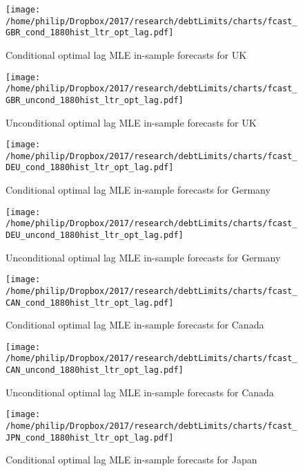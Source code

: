 \documentclass{article}
\begin{document}
	\begin{figure}[htbp]
	    \centering
		\texttt{[image: /home/philip/Dropbox/2017/research/debtLimits/charts/fcast\_GBR\_cond\_1880hist\_ltr\_opt\_lag.pdf]}
		\caption{Conditional optimal lag MLE in-sample forecasts for UK}
	\end{figure}
	
	\begin{figure}[htbp]
	    \centering
		\texttt{[image: /home/philip/Dropbox/2017/research/debtLimits/charts/fcast\_GBR\_uncond\_1880hist\_ltr\_opt\_lag.pdf]}
		\caption{Unconditional optimal lag MLE in-sample forecasts for UK}
	\end{figure}
	
	\begin{figure}[htbp]
	    \centering
		\texttt{[image: /home/philip/Dropbox/2017/research/debtLimits/charts/fcast\_DEU\_cond\_1880hist\_ltr\_opt\_lag.pdf]}
		\caption{Conditional optimal lag MLE in-sample forecasts for Germany}
	\end{figure}
	
	\begin{figure}[htbp]
	    \centering
		\texttt{[image: /home/philip/Dropbox/2017/research/debtLimits/charts/fcast\_DEU\_uncond\_1880hist\_ltr\_opt\_lag.pdf]}
		\caption{Unconditional optimal lag MLE in-sample forecasts for Germany}
	\end{figure}
	
		\begin{figure}[htbp]
	    \centering
		\texttt{[image: /home/philip/Dropbox/2017/research/debtLimits/charts/fcast\_CAN\_cond\_1880hist\_ltr\_opt\_lag.pdf]}
		\caption{Conditional optimal lag MLE in-sample forecasts for Canada}
	\end{figure}
	
	\begin{figure}[htbp]
	    \centering
		\texttt{[image: /home/philip/Dropbox/2017/research/debtLimits/charts/fcast\_CAN\_uncond\_1880hist\_ltr\_opt\_lag.pdf]}
		\caption{Unconditional optimal lag MLE in-sample forecasts for Canada}
	\end{figure}
	
	\begin{figure}[htbp]
	    \centering
		\texttt{[image: /home/philip/Dropbox/2017/research/debtLimits/charts/fcast\_JPN\_cond\_1880hist\_ltr\_opt\_lag.pdf]}
		\caption{Conditional optimal lag MLE in-sample forecasts for Japan}
	\end{figure}
	
\end{document}
